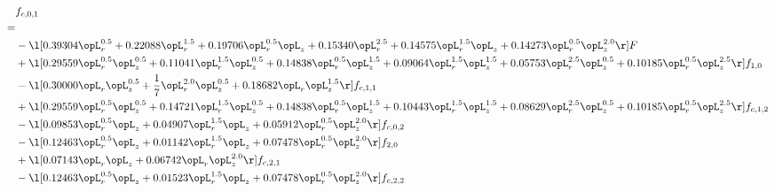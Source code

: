 \begin{alignat}{2} 
\label{eq:f_01_2} 
& f_{c,0,1} \nonumber \\ 
 = \\ 
& - \l[  0.39304 \opL_r^{0.5} +  0.22088 \opL_r^{1.5} +  0.19706 \opL_r^{0.5} \opL_z +  0.15340 \opL_r^{2.5} +  0.14575 \opL_r^{1.5} \opL_z +  0.14273 \opL_r^{0.5} \opL_z^{2.0}  \r] F \nonumber \\ 
& + \l[  0.29559 \opL_r^{0.5} \opL_z^{0.5} +  0.11041 \opL_r^{1.5} \opL_z^{0.5} +  0.14838 \opL_r^{0.5} \opL_z^{1.5} +  0.09064 \opL_r^{1.5} \opL_z^{1.5} +  0.05753 \opL_r^{2.5} \opL_z^{0.5} +  0.10185 \opL_r^{0.5} \opL_z^{2.5}  \r] f_{1,0} \nonumber \\ 
& - \l[  0.30000 \opL_r \opL_z^{0.5} + \frac{1}{7} \opL_r^{2.0} \opL_z^{0.5} +  0.18682 \opL_r \opL_z^{1.5}  \r] f_{c,1,1} \nonumber \\ 
& + \l[  0.29559 \opL_r^{0.5} \opL_z^{0.5} +  0.14721 \opL_r^{1.5} \opL_z^{0.5} +  0.14838 \opL_r^{0.5} \opL_z^{1.5} +  0.10443 \opL_r^{1.5} \opL_z^{1.5} +  0.08629 \opL_r^{2.5} \opL_z^{0.5} +  0.10185 \opL_r^{0.5} \opL_z^{2.5}  \r] f_{c,1,2} \nonumber \\ 
& - \l[  0.09853 \opL_r^{0.5} \opL_z +  0.04907 \opL_r^{1.5} \opL_z +  0.05912 \opL_r^{0.5} \opL_z^{2.0}  \r] f_{c,0,2} \nonumber \\ 
& - \l[  0.12463 \opL_r^{0.5} \opL_z +  0.01142 \opL_r^{1.5} \opL_z +  0.07478 \opL_r^{0.5} \opL_z^{2.0}  \r] f_{2,0} \nonumber \\ 
& + \l[  0.07143 \opL_r \opL_z +  0.06742 \opL_r \opL_z^{2.0}  \r] f_{c,2,1} \nonumber \\ 
& - \l[  0.12463 \opL_r^{0.5} \opL_z +  0.01523 \opL_r^{1.5} \opL_z +  0.07478 \opL_r^{0.5} \opL_z^{2.0}  \r] f_{c,2,2} \nonumber \\ 
\end{alignat} 


